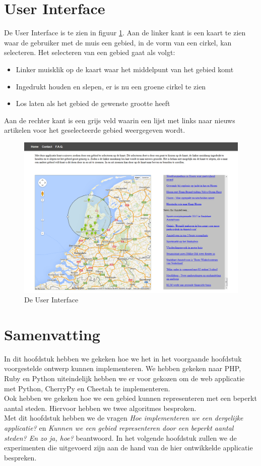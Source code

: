 \documentclass[twoside,openright]{uva-bachelor-thesis}
\begin{document}
		\section{User Interface}
		De User Interface is te zien in figuur \ref{fig:UI}. Aan de linker kant is een kaart te zien waar de gebruiker met de muis een gebied, in de vorm van een cirkel, kan selecteren. Het selecteren van een gebied gaat als volgt:
		\begin{itemize}
			\item Linker muisklik op de kaart waar het middelpunt van het gebied komt
			\item{Ingedrukt houden en slepen, er is nu een groene cirkel te zien}
			\item{Los laten als het gebied de gewenste grootte heeft}
		\end{itemize}
		Aan de rechter kant is een grijs veld waarin een lijst met links naar nieuws artikelen voor het geselecteerde gebied weergegeven wordt.
		\begin{figure}[!htb]
			\centering
			\includegraphics[angle=-90,origin=c,scale=0.70]{./img/UI.png}
			\caption{De User Interface}
			\label{fig:UI}
		\end{figure}
	\section{Samenvatting}
		In dit hoofdstuk hebben we gekeken hoe we het in het voorgaande hoofdstuk voorgestelde ontwerp kunnen implementeren. We hebben gekeken naar PHP, Ruby en Python uiteindelijk hebben we er voor gekozen om de web applicatie met Python, CherryPy en Cheetah te implementeren.
		\\[0.5cm]
		Ook hebben we gekeken hoe we een gebied kunnen representeren met een beperkt aantal steden. Hiervoor hebben we twee algoritmes besproken.
		\\[0.5cm]
		Met dit hoofdstuk hebben we de vragen \textit{Hoe implementeren we een dergelijke applicatie?} en \textit{Kunnen we een gebied representeren door een beperkt aantal steden? En zo ja, hoe?} beantwoord. In het volgende hoofdstuk zullen we de experimenten die uitgevoerd zijn aan de hand van de hier ontwikkelde applicatie bespreken.
\end{document}
